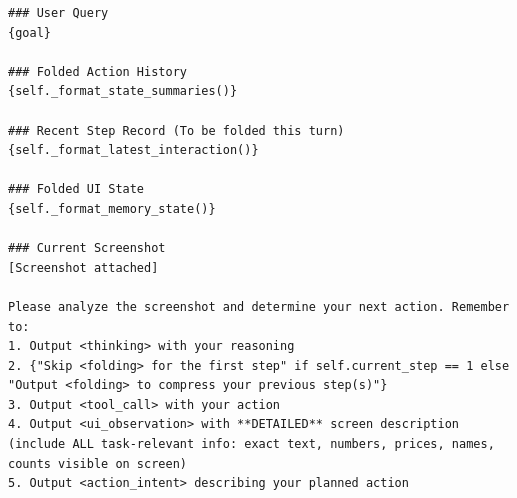 \begin{tcolorbox}[
  promptstyle,
  title=\texttt{Prompt for MemGUI-Agent (per-step user prompt).},
]
\begin{Verbatim}[fontsize=\scriptsize,breaklines,breakanywhere]
### User Query
{goal}

### Folded Action History
{self._format_state_summaries()}

### Recent Step Record (To be folded this turn)
{self._format_latest_interaction()}

### Folded UI State
{self._format_memory_state()}

### Current Screenshot
[Screenshot attached]

Please analyze the screenshot and determine your next action. Remember to:
1. Output <thinking> with your reasoning
2. {"Skip <folding> for the first step" if self.current_step == 1 else "Output <folding> to compress your previous step(s)"}
3. Output <tool_call> with your action
4. Output <ui_observation> with **DETAILED** screen description (include ALL task-relevant info: exact text, numbers, prices, names, counts visible on screen)
5. Output <action_intent> describing your planned action
\end{Verbatim}
\end{tcolorbox}
